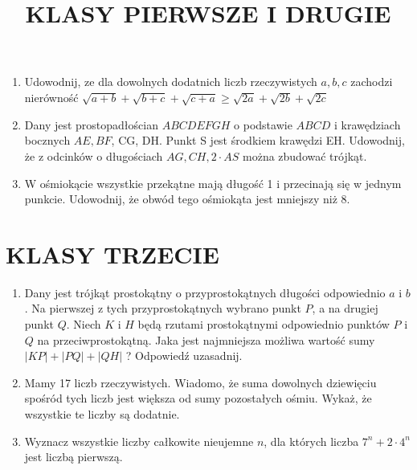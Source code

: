 \documentclass[10pt]{article}
\title{KLASY PIERWSZE I DRUGIE }
\author{}
\date{}
\begin{document}
\maketitle
\begin{enumerate}
  \item Udowodnij, ze dla dowolnych dodatnich liczb rzeczywistych \(a, b, c\) zachodzi nierówność \(\sqrt{a+b}+\sqrt{b+c}+\sqrt{c+a} \geq \sqrt{2 a}+\sqrt{2 b}+\sqrt{2 c}\)
  \item Dany jest prostopadłościan \(A B C D E F G H\) o podstawie \(A B C D\) i krawędziach bocznych \(A E, B F\), CG, DH. Punkt S jest środkiem krawędzi EH. Udowodnij, że z odcinków o długościach \(A G, C H, 2 \cdot A S\) można zbudować trójkąt.
  \item W ośmiokącie wszystkie przekątne mają długość 1 i przecinają się w jednym punkcie. Udowodnij, że obwód tego ośmiokąta jest mniejszy niż 8.
\end{enumerate}

\section*{KLASY TRZECIE}
\begin{enumerate}
  \item Dany jest trójkąt prostokątny o przyprostokątnych długości odpowiednio \(a\) i \(b\). Na pierwszej z tych przyprostokątnych wybrano punkt \(P\), a na drugiej punkt \(Q\). Niech \(K\) i \(H\) będą rzutami prostokątnymi odpowiednio punktów \(P\) i \(Q\) na przeciwprostokątną. Jaka jest najmniejsza możliwa wartość sumy \(|K P|+|P Q|+|Q H|\) ? Odpowiedź uzasadnij.
  \item Mamy 17 liczb rzeczywistych. Wiadomo, że suma dowolnych dziewięciu spośród tych liczb jest większa od sumy pozostałych ośmiu. Wykaż, że wszystkie te liczby są dodatnie.
  \item Wyznacz wszystkie liczby całkowite nieujemne \(n\), dla których liczba \(7^{n}+2 \cdot 4^{n}\) jest liczbą pierwszą.
\end{enumerate}
\end{document}
